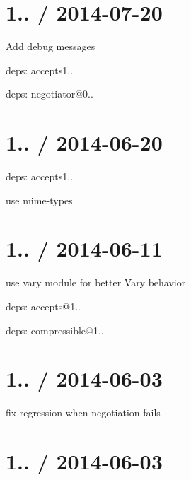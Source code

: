 \section*{1.. / 2014-\/07-\/20 }


\begin{DoxyItemize}
\item Add {\ttfamily debug} messages
\item deps\+: accepts1..
\begin{DoxyItemize}
\item deps\+: negotiator@0..
\end{DoxyItemize}
\end{DoxyItemize}

\section*{1.. / 2014-\/06-\/20 }


\begin{DoxyItemize}
\item deps\+: accepts1..
\begin{DoxyItemize}
\item use {\ttfamily mime-\/types}
\end{DoxyItemize}
\end{DoxyItemize}

\section*{1.. / 2014-\/06-\/11 }


\begin{DoxyItemize}
\item use vary module for better {\ttfamily Vary} behavior
\item deps\+: accepts@1..
\item deps\+: compressible@1..
\end{DoxyItemize}

\section*{1.. / 2014-\/06-\/03 }


\begin{DoxyItemize}
\item fix regression when negotiation fails
\end{DoxyItemize}

\section*{1.. / 2014-\/06-\/03 }


